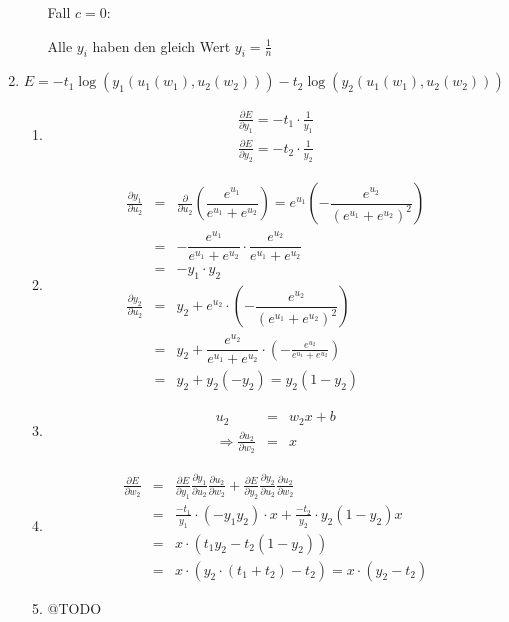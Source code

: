 \documentclass[DIN, pagenumber=false, fontsize=11pt, parskip=half]{scrartcl}
\begin{document}
\begin{enumerate}
\begin{enumerate}[label=(\alph*)]
					Fall $c = 0$:

					Alle $y_i$ haben den gleich Wert $y_i = \frac{1}{n}$
			\end{enumerate}
		\item
			\begin{equation*}
					E = -t_1 \log(y_1(u_1(w_1), u_2(w_2))) -t_2 \log(y_2(u_1(w_1), u_2(w_2)))
			\end{equation*}
			\begin{enumerate}[label=(\alph*)]
				\item
					\begin{eqnarray*}
							\frac{\partial E}{\partial y_1} = -t_1 \cdot \frac{1}{y_1} \\
							\frac{\partial E}{\partial y_2} = -t_2 \cdot \frac{1}{y_2}
					\end{eqnarray*}
				\item
					\begin{eqnarray*}
							\frac{\partial y_1}{\partial u_2} &=& \frac{\partial}{\partial u_2}\left( \dfrac{e^{u_1}}{e^{u_1} + e^{u_2}} \right) = 
							e^{u_1}\left( -\dfrac{e^{u_2}}{(e^{u_1} + e^{u_2})^2} \right) \\
							&=&-\dfrac{e^{u_1}}{e^{u_1} + e^{u_2}} \cdot \dfrac{e^{u_2}}{e^{u_1} + e^{u_2}} \\
							&=& -y_1 \cdot y_2 \\
							\frac{\partial y_2}{\partial u_2} &=& y_2 + e^{u_2} \cdot \left( -\dfrac{e^{u_2}}{(e^{u_1} + e^{u_2})^2}  \right) \\
							&=& y_2 + \dfrac{e^{u_2}}{e^{u_1} + e^{u_2}} \cdot \left( -\frac{e^{u_2}}{e^{u_1} + e^{u_2}}  \right) \\
							&=& y_2 + y_2(-y_2) = y_2 (1-y_2)
					\end{eqnarray*}
				\item
					\begin{eqnarray*}
							u_2 &=& w_2 x + b \\
							\Rightarrow \frac{\partial u_2}{\partial w_2} &=& x
					\end{eqnarray*}
				\item
					\begin{eqnarray*}
							\frac{\partial E}{\partial w_2} &=& \frac{\partial E}{\partial y_1} \frac{\partial y_1}{\partial u_2} \frac{\partial u_2}{\partial w_2} + 
							\frac{\partial E}{\partial y_2} \frac{\partial y_2}{\partial u_2} \frac{\partial u_2}{\partial w_2}  \\
							&=& \frac{-t_1}{y_1} \cdot (-y_1 y_2) \cdot x + \frac{-t_2}{y_2} \cdot y_2(1-y_2)x \\
							&=& x \cdot (t_1 y_2 - t_2(1-y_2)) \\
							&=& x \cdot (y_2 \cdot (t_1 + t_2) - t_2) = x \cdot (y_2 - t_2)
					\end{eqnarray*}
				\item
					@TODO
			\end{enumerate}
	\end{enumerate}
\end{document}
